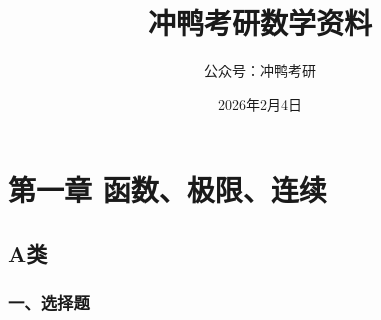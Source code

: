 \documentclass[12pt, a4paper]{ctexart}
\title{冲鸭考研数学资料}
\author{公众号：冲鸭考研}
\date{2026年2月4日}
\begin{document}
\maketitle
\tableofcontents

\newpage

\section{第一章 函数、极限、连续}

\subsection{A类}

\subsubsection*{一、选择题}
\end{document}
